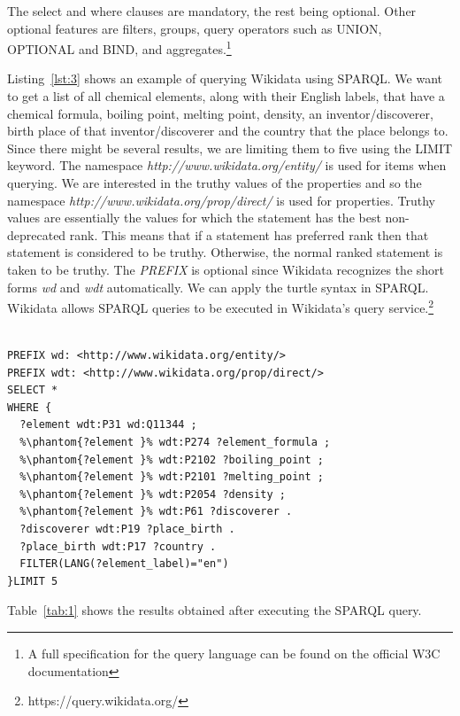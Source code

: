 The select and where clauses are mandatory, the rest being optional. Other optional features are filters, groups, query operators such as UNION, OPTIONAL and BIND, and aggregates.\footnote{A full specification for the query language can be found on the official W3C documentation\cite{Seaborne}}

Listing~\ref{lst:3} shows an example of querying Wikidata using SPARQL. We want to get a list of all chemical elements, along with their English labels, that have a chemical formula, boiling point, melting point, density, an inventor/discoverer, birth place of that inventor/discoverer and the country that the place belongs to. Since there might be several results, we are limiting them to five using the LIMIT keyword. The namespace \textit{http://www.wikidata.org/entity/} is used for items when querying. We are interested in the truthy values of the properties and so the namespace \textit{http://www.wikidata.org/prop/direct/} is used for properties. Truthy values are essentially the values for which the statement has the best non-deprecated rank. This means that if a statement has preferred rank then that statement is considered to be truthy. Otherwise, the normal ranked statement is taken to be truthy. The \textit{PREFIX} is optional since Wikidata recognizes the short forms \textit{wd} and \textit{wdt} automatically. We can apply the turtle syntax in SPARQL. Wikidata allows SPARQL queries to be executed in Wikidata's query service.\footnote{https://query.wikidata.org/}  

\begin{minipage}{\linewidth}
\begin{lstlisting}[label=lst:3, caption={Querying Wikidata with SPARQL}, language=SPARQL]

PREFIX wd: <http://www.wikidata.org/entity/>
PREFIX wdt: <http://www.wikidata.org/prop/direct/>
SELECT *
WHERE {
  ?element wdt:P31 wd:Q11344 ;
  %\phantom{?element }% wdt:P274 ?element_formula ; 
  %\phantom{?element }% wdt:P2102 ?boiling_point ;
  %\phantom{?element }% wdt:P2101 ?melting_point ;
  %\phantom{?element }% wdt:P2054 ?density ;
  %\phantom{?element }% wdt:P61 ?discoverer .
  ?discoverer wdt:P19 ?place_birth .
  ?place_birth wdt:P17 ?country .
  FILTER(LANG(?element_label)="en")
}LIMIT 5

\end{lstlisting}
\end{minipage}

Table~\ref{tab:1} shows the results obtained after executing the SPARQL query.

